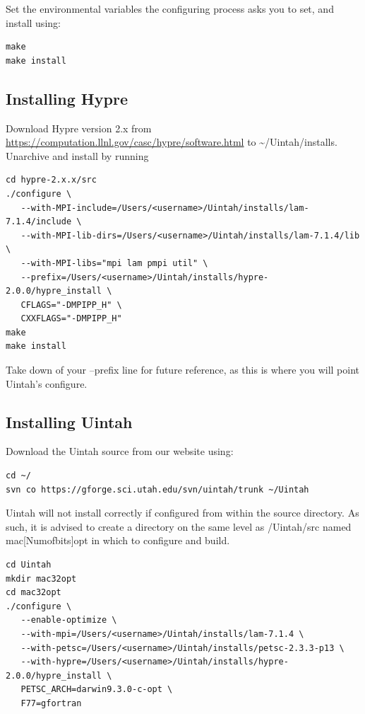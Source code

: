 \documentclass[12pt]{article}
\begin{document}
Set the environmental variables the configuring process asks you to
set, and install using:

\begin{verbatim}
make
make install
\end{verbatim}

\subsection{Installing Hypre}
Download Hypre version 2.x from
\url{https://computation.llnl.gov/casc/hypre/software.html} to
\textasciitilde/Uintah/installs.  Unarchive and install by running

\begin{verbatim}
cd hypre-2.x.x/src
./configure \
   --with-MPI-include=/Users/<username>/Uintah/installs/lam-7.1.4/include \
   --with-MPI-lib-dirs=/Users/<username>/Uintah/installs/lam-7.1.4/lib \
   --with-MPI-libs="mpi lam pmpi util" \
   --prefix=/Users/<username>/Uintah/installs/hypre-2.0.0/hypre_install \
   CFLAGS="-DMPIPP_H" \
   CXXFLAGS="-DMPIPP_H" 
make
make install
\end{verbatim}

Take down of your --prefix line for future reference, as this is where
you will point Uintah's configure.

\subsection{Installing Uintah}
Download the Uintah source from our website using:

\begin{verbatim}
cd ~/
svn co https://gforge.sci.utah.edu/svn/uintah/trunk ~/Uintah
\end{verbatim}

Uintah will not install correctly if configured from within the source
directory.  As such, it is advised to create a directory on the same
level as /Uintah/src named mac[Numofbits]opt in which to configure and
build.

\begin{verbatim}
cd Uintah
mkdir mac32opt
cd mac32opt
./configure \
   --enable-optimize \
   --with-mpi=/Users/<username>/Uintah/installs/lam-7.1.4 \
   --with-petsc=/Users/<username>/Uintah/installs/petsc-2.3.3-p13 \
   --with-hypre=/Users/<username>/Uintah/installs/hypre-2.0.0/hypre_install \
   PETSC_ARCH=darwin9.3.0-c-opt \
   F77=gfortran
\end{verbatim}
\end{document}
